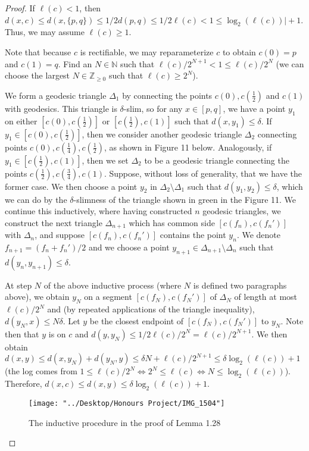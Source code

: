 \documentclass[12pt]{article}
\newcommand{\vs}{\vskip10pt}
\begin{document}
	\begin{proof}
		
		If $\ell(c) < 1$, then $d(x,c) \leq d(x, \{p,q\}) \leq 1/2 d(p,q) \leq 1/2 \ell(c) < 1 \leq \log_2( \ell(c)) \vert + 1$. Thus, we may assume $\ell(c) \geq 1$. 
		
		\vs 
	
		Note that because $c$ is rectifiable, we may reparameterize $c$ to obtain $c(0) = p$ and $c(1) = q$. Find an $N \in \mathbb{N}$ such that $\ell(c)/2^{N+1} < 1 \leq \ell(c)/2^N$ (we can choose the largest $N \in \mathbb{Z}_{\geq 0}$ such that $\ell(c) \geq 2^N$). 
		
		\vs 
		
		We form a geodesic triangle $\Delta_1$ by connecting the points $c(0), c(\frac{1}{2})$ and $c(1)$ with geodesics. This triangle is $\delta$-slim, so for any $x \in [p,q]$, we have a point $y_1$ on either $[c(0), c(\frac{1}{2})]$ or $[c(\frac{1}{2}), c(1)]$ such that $d(x,y_1) \leq \delta$. If $y_1 \in [c(0), c(\frac{1}{2})]$, then we consider another geodesic triangle $\Delta_2$ connecting points $c(0), c(\frac{1}{4}), c(\frac{1}{2})$, as shown in Figure 11 below. Analogously, if $y_1 \in [c(\frac{1}{2}), c(1)]$, then we set $\Delta_2$ to be a geodesic triangle connecting the points $c(\frac{1}{2}), c(\frac{3}{4}), c(1)$. Suppose, without loss of generality, that we have the former case. We then choose a point $y_2$ in $\Delta_2 \setminus \Delta_1$ such that $d(y_1, y_2) \leq \delta$, which we can do by the $\delta$-slimness of the triangle shown in green in the Figure 11. We continue this inductively, where having constructed $n$ geodesic triangles, we construct the next triangle $\Delta_{n+1}$ which has common side $[c(f_n), c(f_n')]$ with $\Delta_n$, and suppose $[c(f_n), c(f_n')]$ contains the point $y_n$. We denote $f_{n+1} = (f_n + f_n')/2$ and we choose a point $y_{n+1} \in \Delta_{n+1} \setminus \Delta_n$ such that $d(y_n, y_{n+1}) \leq \delta$. 
		
		\vs 
		
		At step $N$ of the above inductive process (where $N$ is defined two paragraphs above), we obtain $y_N$ on a segment $[c(f_N), c(f_N')]$ of $\Delta_{N}$ of length at most $\ell(c)/2^N$ and (by repeated applications of the triangle inequality), $d(y_N, x) \leq N \delta$. Let $y$ be the closest endpoint of $[c(f_N), c(f_N')]$ to $y_N$. Note then that $y$ is on $c$ and $d(y, y_N) \leq 1/2 \ell(c)/2^N = \ell(c) / 2^{N+1}$. We then obtain $d(x,y) \leq d(x, y_N) + d(y_N, y) \leq \delta N + \ell(c)/2^{N+1} \leq \delta \log_2 (\ell(c)) +1$ (the log comes from $1 \leq \ell(c) / 2^N \iff 2^N \leq \ell(c) \iff N \leq \log_2 (\ell(c))$). Therefore, $d(x, c) \leq d(x, y) \leq \delta \log_2 (\ell(c)) +1$. 
		
\begin{figure} [H]
	\centering
	\texttt{[image: "../Desktop/Honours Project/IMG\_1504"]}
	\caption{The inductive procedure in the proof of Lemma 1.28}
	\label{fig:img1504}
\end{figure}
		 		
	\end{proof}
	
\end{document}

